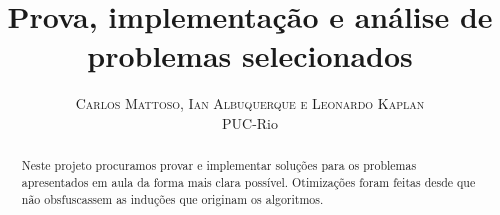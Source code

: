 \documentclass[twoside]{article}
\title{\vspace{-15mm}\fontsize{24pt}{10pt}\selectfont\textbf{Prova, implementação e análise de problemas selecionados}} %
\author{
\large
\textsc{Carlos Mattoso, Ian Albuquerque e Leonardo Kaplan}\\[2mm] %
\normalsize PUC-Rio \\ %
}
\date{}
\begin{document}
\maketitle %

\thispagestyle{fancy} %


\begin{abstract}

\noindent 
Neste projeto procuramos provar e implementar soluções para os problemas apresentados em aula da forma mais clara possível.
Otimizações foram feitas desde que não obsfuscassem as induções que originam os algoritmos.
\end{abstract}

\end{document}
